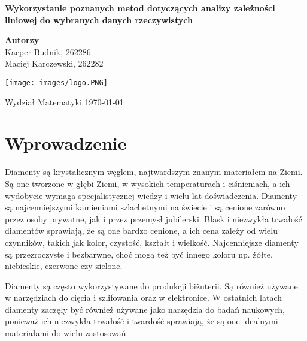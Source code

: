\documentclass[12pt]{article}
\theoremstyle{exer}
\begin{document}
	\begin{titlepage}
		\begin{center}
			
			\textbf{\Huge  Wykorzystanie poznanych metod dotyczących analizy zależności liniowej
				do wybranych danych rzeczywistych}
			
			\vspace{0.5cm}
			
			\vspace{1.5cm}
			
			\textbf{\LARGE Autorzy}\\
			\vspace{0.5cm}
			\large Kacper Budnik, 262286\\
			\large Maciej Karczewski, 262282\\
			
			
			\vfill
			
			\vspace{0.4cm}
			
			\texttt{[image: images/logo.PNG]}
			
			\vspace{0.8cm}
			Wydział Matematyki	
			\today
		\end{center}
	\end{titlepage}
	\tableofcontents
	\newpage
	
	\section{Wprowadzenie}
	Diamenty są krystalicznym węglem, najtwardszym znanym materiałem na Ziemi. Są one tworzone w głębi Ziemi, w wysokich temperaturach i ciśnieniach, a ich wydobycie wymaga specjalistycznej wiedzy i wielu lat doświadczenia. Diamenty są najcenniejszymi kamieniami szlachetnymi na świecie i są cenione zarówno przez osoby prywatne, jak i przez przemysł jubilerski. Blask i niezwykła trwałość diamentów sprawiają, że są one bardzo cenione, a ich cena zależy od wielu czynników, takich jak kolor, czystość, kształt i wielkość. Najcenniejsze diamenty są przezroczyste i bezbarwne, choć mogą też być innego koloru np.  żółte, niebieskie, czerwone czy zielone.
	
	Diamenty są często wykorzystywane do produkcji biżuterii. Są również używane  w  narzędziach do cięcia i szlifowania oraz w elektronice. W ostatnich latach diamenty zaczęły być również używane jako narzędzia do badań naukowych, ponieważ ich niezwykła trwałość i twardość sprawiają, że są one idealnymi materiałami do wielu zastosowań.
	
\end{document}
